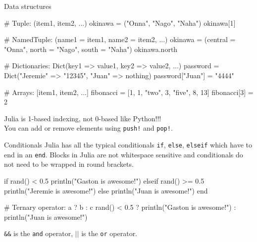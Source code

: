 \documentclass{beamer}
\newenvironment{Boxx}{\begin{tcolorbox}[standard jigsaw, opacityframe=0.8, opacityback=0.0]}{\end{tcolorbox}}
\begin{document}
\begin{frame}[fragile]{Data structures}
	\begin{Boxx}
	\begin{jllisting}
  # Tuple: (item1, item2, ...)
  okinawa = ("Onna", "Nago", "Naha")
  okinawa[1] 
		
  # NamedTuple: (name1 = item1, name2 = item2, ...)
  okinawa = (central = "Onna", north = "Nago", south = "Naha")
  okinawa.north 
		
  # Dictionaries: Dict(key1 => value1, key2 => value2, ...)
  password = Dict("Jeremie" => "12345", "Juan" => nothing)
  password["Juan"] = "4444"
		
  # Arrays: [item1, item2, ...]
  fibonacci = [1, 1, "two", 3, "five", 8, 13]
  fibonacci[3] = 2
	\end{jllisting}
\end{Boxx}

Julia is 1-based indexing, not 0-based like Python!!!\\
You can add or remove elements using \verb|push!| and \verb|pop!|.
\end{frame}


\begin{frame}[fragile]{Conditionals}
  Julia has all the typical conditionals \verb|if|, \verb|else|, \verb|elseif| which have to end in an \verb|end|.
  Blocks in Julia are not whitespace sensitive and conditionals do not need to be wrapped in round brackets.
  \begin{Boxx}
  \begin{jllisting}
  if rand() < 0.5
    println("Gaston is awesome!")
  elseif rand() >= 0.5
    println("Jeremie is awesome!")
  else
    println("Juan is awesome!")
  end
  
  # Ternary operator: a ? b : c
  rand() < 0.5 ? println("Gaston  is awesome!") : println("Juan  is awesome!")
\end{jllisting}
\end{Boxx}

\verb|&&| is the \verb|and| operator, $||$ is the \verb|or| operator.
\end{frame}
\end{document}

